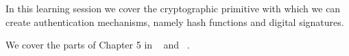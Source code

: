 In this learning session we cover the cryptographic primitive with which we can
create authentication mechanisms, namely hash functions and digital signatures.

We cover the parts of Chapter 5 in
~\cite{Anderson2008sea} and
~\cite{Gollmann2011cs}.
